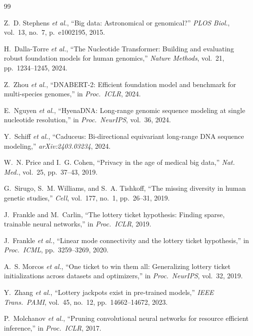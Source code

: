 \documentclass[journal]{IEEEtran}
\begin{document}
\begin{thebibliography}{99}

Z.~D. Stephens \textit{et al.},
``Big data: Astronomical or genomical?''
\textit{PLOS Biol.}, vol.~13, no.~7, p.~e1002195, 2015.

H.~Dalla-Torre \textit{et al.},
``The Nucleotide Transformer: Building and evaluating robust
foundation models for human genomics,''
\textit{Nature Methods}, vol.~21, pp.~1234--1245, 2024.

Z.~Zhou \textit{et al.},
``DNABERT-2: Efficient foundation model and benchmark for
multi-species genomes,''
in \textit{Proc.\ ICLR}, 2024.

E.~Nguyen \textit{et al.},
``HyenaDNA: Long-range genomic sequence modeling at single
nucleotide resolution,''
in \textit{Proc.\ NeurIPS}, vol.~36, 2024.

Y.~Schiff \textit{et al.},
``Caduceus: Bi-directional equivariant long-range DNA sequence
modeling,''
\textit{arXiv:2403.03234}, 2024.

W.~N. Price and I.~G. Cohen,
``Privacy in the age of medical big data,''
\textit{Nat. Med.}, vol.~25, pp.~37--43, 2019.

G.~Sirugo, S.~M. Williams, and S.~A. Tishkoff,
``The missing diversity in human genetic studies,''
\textit{Cell}, vol.~177, no.~1, pp.~26--31, 2019.

J.~Frankle and M.~Carlin,
``The lottery ticket hypothesis: Finding sparse, trainable
neural networks,''
in \textit{Proc.\ ICLR}, 2019.

J.~Frankle \textit{et al.},
``Linear mode connectivity and the lottery ticket hypothesis,''
in \textit{Proc.\ ICML}, pp.~3259--3269, 2020.

A.~S. Morcos \textit{et al.},
``One ticket to win them all: Generalizing lottery ticket
initializations across datasets and optimizers,''
in \textit{Proc.\ NeurIPS}, vol.~32, 2019.

Y.~Zhang \textit{et al.},
``Lottery jackpots exist in pre-trained models,''
\textit{IEEE Trans.\ PAMI}, vol.~45, no.~12,
pp.~14662--14672, 2023.

P.~Molchanov \textit{et al.},
``Pruning convolutional neural networks for resource efficient
inference,''
in \textit{Proc.\ ICLR}, 2017.


\end{thebibliography}
\end{document}
